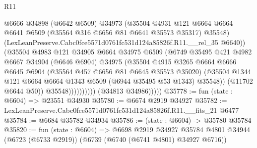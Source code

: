 \begin{lexlean}{R11}
\begin{coremodule}
                                @6666
                                @34898
                                (@6642 @6509)
                                @34973
                                (@35504
                                  @4931
                                  @121
                                  @6664
                                  @6664
                                  @6641
                                  @6509
                                  (@35564 @316 @6656 @81 @6641 @35573 @35317)
                                  @35548)
                                (LexLeanPreserve.Cabc0fce5571d0761fc531d124a85826f.R11.__rel_35
                                  @6640))
                              (@35504
                                @4983
                                @121
                                @34905
                                @6664
                                @34975
                                @6509
                                (@6749
                                  @35495
                                  @421
                                  @4982
                                  @6667
                                  @34904
                                  (@6646 @6904)
                                  @34975
                                  (@35504
                                    @4915
                                    @3265
                                    @6664
                                    @6666
                                    @6645
                                    @6904
                                    (@35564 @457 @6656 @81 @6645 @35573 @35020)
                                    (@35504
                                      @1344
                                      @121
                                      @6664
                                      @6664
                                      @1343
                                      @6509
                                      (@6944 @35495 @53 @1343)
                                      @35548))
                                  (@11702 @6644 @50))
                                @35548))))))))))
            (@34813 @34986)))))
@35778 := fun (state : @6604) => @23551 @34930
@35780 := @6674 @2919 @34927
@35782 := LexLeanPreserve.Cabc0fce5571d0761fc531d124a85826f.R11.__fits_21 @6477
@35784 := @6684 @35782 @34934
@35786 := (state : @6604) -> @35780 @35784
@35820 := fun (state : @6604) =>
  @6698
    @2919
    @34927
    @35784
    @4801
    @34944
    (@6723 (@6733 @2919))
    (@6739 (@6740 (@6741 @4801) @34927 @6716))

\end{coremodule}
\end{lexlean}

